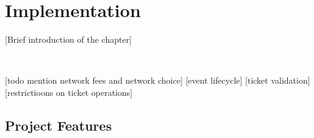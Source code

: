 \chapter{Implementation}
 [Brief introduction of the chapter]


~

[todo mention network fees and network choice]
[event lifecycle]
[ticket validation]
[restrictioons on ticket operations]

\section{Project Features}
